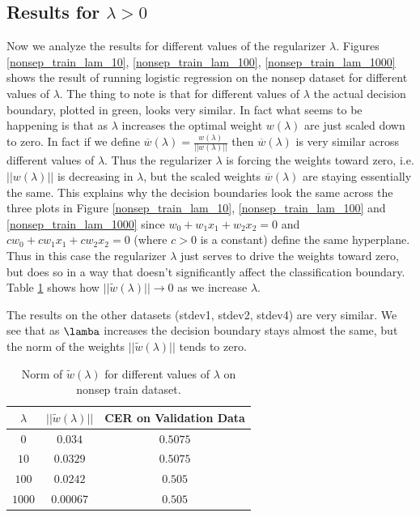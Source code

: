 \documentclass[10pt]{article}
\begin{document}
\subsection*{Results for $\lambda > 0$}
Now we analyze the results for different values of the regularizer $\lambda$. Figures \ref{nonsep_train_lam_10}, \ref{nonsep_train_lam_100}, \ref{nonsep_train_lam_1000} shows the result of running logistic regression on the nonsep dataset for different values of $\lambda$. The thing to note is that for different values of $\lambda$ the actual decision boundary, plotted in green, looks very similar. In fact what seems to be happening is that as $\lambda$ increases the optimal weight $w(\lambda)$ are just scaled down to zero. In fact if we define $\overline{w}(\lambda) = \frac{w(\lambda)}{||w(\lambda)||}$ then $\overline{w}(\lambda)$ is very similar across different values of $\lambda$. Thus the regularizer $\lambda$ is forcing the weights toward zero, i.e. $||w(\lambda)||$ is decreasing in $\lambda$, but the scaled weights $\overline{w}(\lambda)$ are staying essentially the same. This explains why the decision boundaries look the same across the three plots in Figure \ref{nonsep_train_lam_10}, \ref{nonsep_train_lam_100} and \ref{nonsep_train_lam_1000} since $w_0 + w_1 x_1 + w_2 x_2 = 0$ and $c w_0 + c w_1 x_1 + c w_2 x_2 = 0$ (where $c > 0$ is a constant) define the same hyperplane. Thus in this case the regularizer $\lambda$ just serves to drive the weights toward zero, but does so in a way that doesn't significantly affect the classification boundary. Table \ref{w_lam_norm} shows how $||\tilde{w}(\lambda)|| \to 0$ as we increase $\lambda$.

The results on the other datasets (stdev1, stdev2, stdev4) are very similar. We see that as $\lamba$ increases the decision boundary stays almost the same, but the norm of the weights $||\tilde{w}(\lambda)||$ tends to zero. 

\begin{table}[H]
\begin{tabular}{|c|c|c|}
\hline
$\lambda$ & $||\tilde{w}(\lambda)||$ & CER on Validation Data\\ \hline
$0$ & $0.034$ & $0.5075$ \\ \hline
$10$ & $0.0329$ & $0.5075$ \\ \hline
$100$ & $0.0242$ & $0.505$\\ \hline
$1000$ & $0.00067$ & $0.505$ \\ \hline
\end{tabular}
%
%


\caption{Norm of $\tilde{w}(\lambda)$ for different values of $\lambda$ on nonsep train dataset.}
\label{w_lam_norm}
\end{table}
\end{document}
